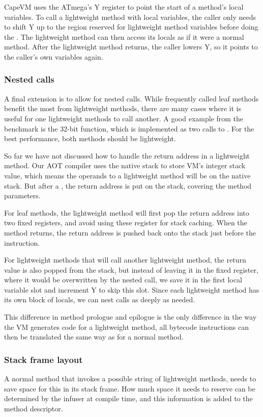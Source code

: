 CapeVM uses the ATmega's Y register to point the start of a method's local variables. To call a lightweight method with local variables, the caller only needs to shift Y up to the region reserved for lightweight method variables before doing the . The lightweight method can then access its locals as if it were a normal method. After the lightweight method returns, the caller lowers Y, so it points to the caller's own variables again.

\subsubsection{Nested calls}
A final extension is to allow for nested calls. While frequently called leaf methods benefit the most from lightweight methods, there are many cases where it is useful for one lightweight methods to call another. A good example from the  benchmark is the 32-bit  function, which is implemented as two calls to . For the best performance, both methods should be lightweight.

So far we have not discussed how to handle the return address in a lightweight method. Our AOT compiler uses the native stack to store VM's integer stack value, which means the operands to a lightweight method will be on the native stack. But after a , the return address is put on the stack, covering the method parameters.

For leaf methods, the lightweight method will first pop the return address into two fixed registers, and avoid using these register for stack caching. When the method returns, the return address is pushed back onto the stack just before the  instruction.

For lightweight methods that will call another lightweight method, the return value is also popped from the stack, but instead of leaving it in the fixed register, where it would be overwritten by the nested call, we save it in the first local variable slot and increment Y to skip this slot. Since each lightweight method has its own block of locals, we can nest calls as deeply as needed.

This difference in method prologue and epilogue is the only difference in the way the VM generates code for a lightweight method, all bytecode instructions can then be translated the same way as for a normal method.

\subsubsection{Stack frame layout}
A normal method that invokes a possible string of lightweight methods, needs to save space for this in its stack frame. How much space it needs to reserve can be determined by the infuser at compile time, and this information is added to the method descriptor.

